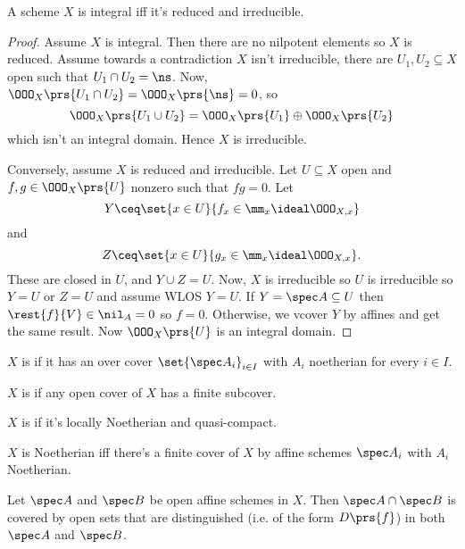 \documentclass[10pt,a4paper,twoside,openany,hidelinks]{book}
\begin{document}
\begin{proposition}
A scheme $X$ is integral iff it's reduced and irreducible.
\end{proposition}

\begin{proof}
Assume $X$ is integral. Then there are no nilpotent elements so $X$ is reduced.
Assume towards a contradiction $X$ isn't irreducible, there are $U_1, U_2 \subseteq X$ open such that $U_1 \cap U_2 = \ns$.
Now, $\OOO_X\prs{U_1 \cap U_2} = \OOO_X\prs{\ns} = 0$, so
$$\OOO_X\prs{U_1 \cup U_2} = \OOO_X\prs{U_1} \oplus \OOO_X\prs{U_2}$$
which isn't an integral domain.
Hence $X$ is irreducible.

Conversely, assume $X$ is reduced and irreducible. Let $U \subseteq X$ open and $f,g \in \OOO_X\prs{U}$ nonzero such that $fg = 0$.
Let $$Y \ceq \set{x \in U}{f_x \in \mm_x \ideal \OOO_{X,x}}$$
and
$$Z \ceq \set{x \in U}{g_x \in \mm_x \ideal \OOO_{X,x}} \text{.}$$
These are closed in $U$, and $Y \cup Z = U$.
Now, $X$ is irreducible so $U$ is irreducible so $Y = U$ or $Z = U$ and assume WLOS $Y=U$.
If $Y = \spec A \subseteq U$ then $\rest{f}{V} \in \nil_A = 0$ so $f = 0$. Otherwise, we vcover $Y$ by affines and get the same result.
Now $\OOO_X\prs{U}$ is an integral domain.
\end{proof}

\begin{definition}
$X$ is  if it has an over cover $\set{\spec A_i}_{i \in I}$ with $A_i$ noetherian for every $i \in I$.
\end{definition}

\begin{definition}
$X$ is  if any open cover of $X$ has a finite subcover.
\end{definition}

\begin{definition}
$X$ is  if it's locally Noetherian and quasi-compact.
\end{definition}

\begin{remark}
$X$ is Noetherian iff there's a finite cover of $X$ by affine schemes $\spec A_i$ with $A_i$ Noetherian.
\end{remark}

\begin{lemma}
Let $\spec A$ and $\spec B$ be open affine schemes in $X$. Then $\spec A \cap \spec B$ is covered by open sets that are distinguished (i.e. of the form $D\prs{f}$) in both $\spec A$ and $\spec B$.
\end{lemma}
\end{document}
